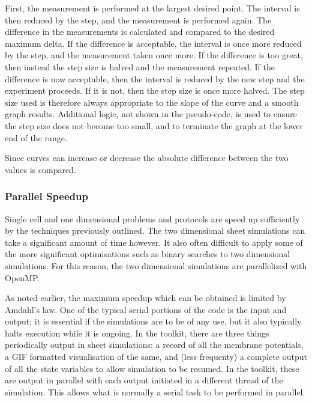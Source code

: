 First, the measurement is performed at the largest desired point.  The interval
is then reduced by the step, and the measurement is performed again.  The
difference in the measurements is calculated and compared to the desired maximum
delta.  If the difference is acceptable, the interval is once more reduced by
the step, and the measurement taken once more.  If the difference is too great,
then instead the step size is halved and the measurement repeated.  If the
difference is now acceptable, then the interval is reduced by the new step and
the experiment proceeds.  If it is not, then the step size is once more halved.
The step size used is therefore always appropriate to the slope of the curve and
a smooth graph results.  Additional logic, not shown in the pseudo-code, is used
to ensure the step size does not become too small, and to terminate the graph at
the lower end of the range.

Since curves can increase or decrease the absolute difference between the two
values is compared.

\subsubsection{Parallel Speedup}

Single cell and one dimensional problems and protocols are speed up sufficiently
by the techniques previously outlined.
The two dimensional sheet simulations can take a significant amount of time
however.
It also often difficult to apply some of the more significant optimisations such
as binary searches to two dimensional simulations.
For this reason, the two dimensional simulations are parallelized with OpenMP.

As noted earlier, the maximum speedup which can be obtained is limited by
Amdahl's law.
One of the typical serial portions of the code is the input and output; it is
essential if the simulations are to be of any use, but it also typically halts
execution while it is ongoing.
In the toolkit, there are three things periodically output in sheet simulations: a record of all the
membrane potentials, a GIF formatted visualisation of the same, and (less
frequenty) a complete output of all the state variables to allow simulation to
be resumed.
In the toolkit, these are output in parallel with each output initiated in a
different thread of the simulation.
This allows what is normally a serial task to be performed in parallel.

